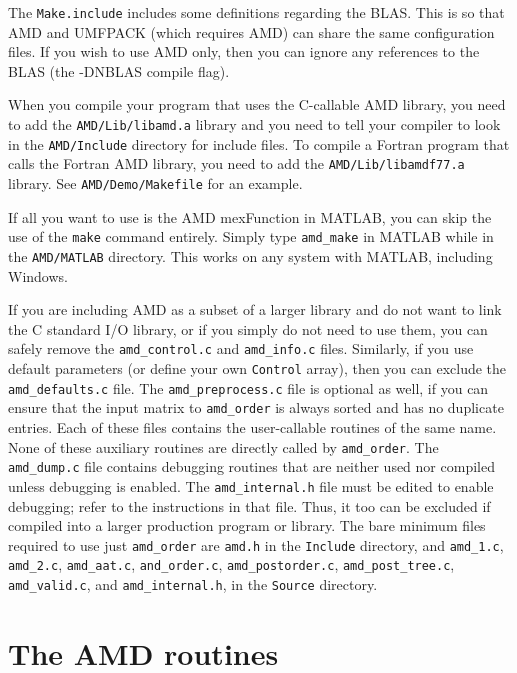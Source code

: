 \documentclass[11pt]{article}
\begin{document}
The {\tt Make.include} includes some definitions regarding the BLAS.
This is so that AMD and UMFPACK (which requires AMD) can share
the same configuration files.  If you wish to use AMD only, then
you can ignore any references to the BLAS (the -DNBLAS compile flag).

When you compile your program that uses the C-callable AMD library,
you need to add the {\tt AMD/Lib/libamd.a} library
and you need to tell your compiler to look in the
{\tt AMD/Include} directory for include
files.   To compile a Fortran program that calls the Fortran AMD library,
you need to add the {\tt AMD/Lib/libamdf77.a} library.
See {\tt AMD/Demo/Makefile} for an example.

If all you want to use is the AMD mexFunction in MATLAB, you can skip
the use of the {\tt make} command entirely.  Simply type
{\tt amd\_make} in MATLAB while in the {\tt AMD/MATLAB} directory.
This works on any system with MATLAB, including Windows.

If you are including AMD as a subset of a larger library and do not want
to link the C standard I/O library, or if you simply do not need to use
them, you can safely remove the {\tt amd\_control.c} and {\tt amd\_info.c}
files.  Similarly, if you use default parameters (or define your
own {\tt Control} array), then you can exclude the {\tt amd\_defaults.c}
file.  The {\tt amd\_preprocess.c} file is optional as well, if you
can ensure that the input matrix to {\tt amd\_order} is always sorted
and has no duplicate entries.
Each of these files contains the user-callable routines of the same
name.  None of these auxiliary routines are directly called by
{\tt amd\_order}.
The {\tt amd\_dump.c} file contains debugging routines
that are neither used nor compiled unless debugging is enabled.
The {\tt amd\_internal.h} file must be edited to enable debugging;
refer to the instructions in that file.  Thus, it too can be excluded
if compiled into a larger production program or library.
The bare minimum files required to use just {\tt amd\_order} are
{\tt amd.h} in the {\tt Include} directory,
and
{\tt amd\_1.c},
{\tt amd\_2.c},
{\tt amd\_aat.c},
{\tt and\_order.c},
{\tt amd\_postorder.c},
{\tt amd\_post\_tree.c},
{\tt amd\_valid.c},
and
{\tt amd\_internal.h},
in the {\tt Source} directory.

\newpage
\section{The AMD routines}
\label{Primary}
\end{document}
